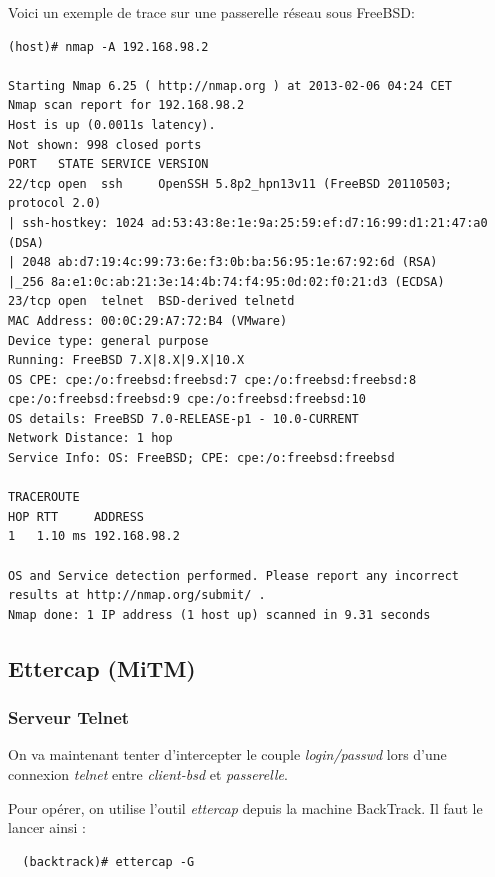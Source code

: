 \documentclass[a4paper]{article}
\begin{document}
Voici un exemple de trace sur une passerelle réseau sous FreeBSD:
\begin{verbatim}
(host)# nmap -A 192.168.98.2

Starting Nmap 6.25 ( http://nmap.org ) at 2013-02-06 04:24 CET
Nmap scan report for 192.168.98.2
Host is up (0.0011s latency).
Not shown: 998 closed ports
PORT   STATE SERVICE VERSION
22/tcp open  ssh     OpenSSH 5.8p2_hpn13v11 (FreeBSD 20110503; protocol 2.0)
| ssh-hostkey: 1024 ad:53:43:8e:1e:9a:25:59:ef:d7:16:99:d1:21:47:a0 (DSA)
| 2048 ab:d7:19:4c:99:73:6e:f3:0b:ba:56:95:1e:67:92:6d (RSA)
|_256 8a:e1:0c:ab:21:3e:14:4b:74:f4:95:0d:02:f0:21:d3 (ECDSA)
23/tcp open  telnet  BSD-derived telnetd
MAC Address: 00:0C:29:A7:72:B4 (VMware)
Device type: general purpose
Running: FreeBSD 7.X|8.X|9.X|10.X
OS CPE: cpe:/o:freebsd:freebsd:7 cpe:/o:freebsd:freebsd:8 cpe:/o:freebsd:freebsd:9 cpe:/o:freebsd:freebsd:10
OS details: FreeBSD 7.0-RELEASE-p1 - 10.0-CURRENT
Network Distance: 1 hop
Service Info: OS: FreeBSD; CPE: cpe:/o:freebsd:freebsd

TRACEROUTE
HOP RTT     ADDRESS
1   1.10 ms 192.168.98.2

OS and Service detection performed. Please report any incorrect results at http://nmap.org/submit/ .
Nmap done: 1 IP address (1 host up) scanned in 9.31 seconds
\end{verbatim}
\subsection{Ettercap (MiTM)}
\subsubsection{Serveur Telnet}
On va maintenant tenter d'intercepter le couple \textit{login/passwd}
lors d'une connexion \textit{telnet} entre \textit{client-bsd}
et \textit{passerelle}.

Pour opérer, on utilise l'outil \textit{ettercap} depuis la machine BackTrack. 
Il faut le lancer ainsi :
\begin{verbatim}
  (backtrack)# ettercap -G
\end{verbatim}
\end{document}
